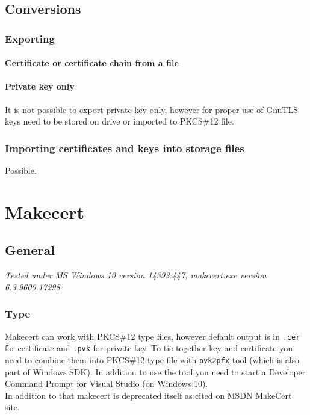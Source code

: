 \documentclass[10pt, a4paper]{report}
\begin{document}
\section{Conversions}

  \subsection{Exporting}
  
    \subsubsection{Certificate or certificate chain from a file}
    
    \subsubsection{Private key only}
It is not possible to export private key only, however for proper use of GnuTLS keys need to be stored on drive or imported to PKCS\#12 file.
  \subsection{Importing certificates and keys into storage files}
Possible.   



\chapter{Makecert}

\section{General}

\textit{Tested under MS Windows 10 version 14393.447, makecert.exe version 6.3.9600.17298}

  \subsection{Type}
Makecert can work with PKCS\#12 type files, however  default output is in \verb+.cer+ for certificate and \verb+.pvk+ for private key. To tie together key and certificate you need to combine them into PKCS\#12 type file with \verb+pvk2pfx+ tool (which is also part of Windows SDK). In addition to use the tool you need to start a Developer Command Prompt for Visual Studio (on Windows 10). 
\\ 
In addition to that makecert is deprecated itself as cited on MSDN MakeCert site.
\end{document}
